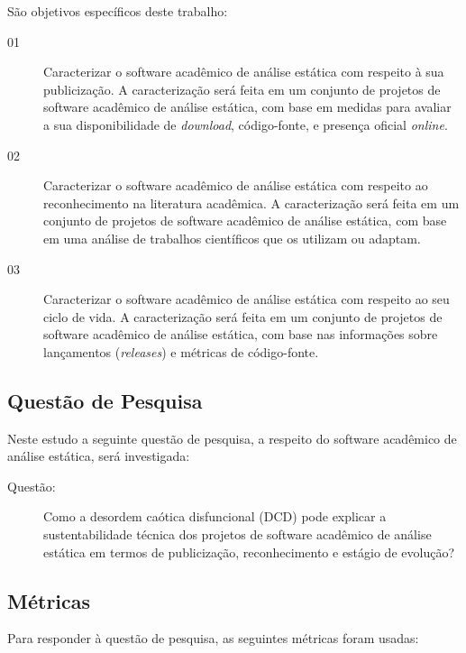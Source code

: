 São objetivos específicos deste trabalho:

\begin{description}
  \item [01]
    Caracterizar o software acadêmico de análise estática com respeito à sua
    publicização.
    A caracterização será feita em um conjunto de projetos de software acadêmico de análise
    estática, com base em medidas para avaliar a sua disponibilidade de
    {\it download}, código-fonte, e presença oficial {\it online}.
  \item [02]
    Caracterizar o software acadêmico de análise estática com respeito ao
    reconhecimento na literatura acadêmica.
    A caracterização será feita em um conjunto de projetos de software acadêmico de análise
    estática, com base em uma análise de trabalhos científicos que os utilizam ou
    adaptam.
  \item [03]
    Caracterizar o software acadêmico de análise estática com respeito ao
    seu ciclo de vida.
    A caracterização será feita em um conjunto de projetos de software acadêmico de análise
    estática, com base nas informações sobre lançamentos ({\it releases}) e
    métricas de código-fonte.
\end{description}

\subsection{Questão de Pesquisa}

\newcommand{\QuestaoGeralUm}{
  Como a desordem caótica disfuncional (DCD) pode explicar a sustentabilidade técnica
  dos projetos de software acadêmico de análise estática em
  termos de publicização, reconhecimento e estágio de evolução?
}

Neste estudo a seguinte questão de pesquisa, a respeito do software acadêmico
de análise estática, será investigada:

\begin{description}
  \item [Questão:] \QuestaoGeralUm
\end{description}

\subsection{Métricas}

Para responder à questão de pesquisa, as seguintes métricas foram usadas:

